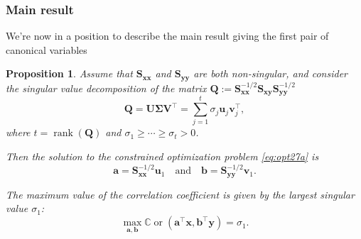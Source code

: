\documentclass[
]{book}
\newtheorem{proposition}{Proposition}[chapter]
\theoremstyle{definition}
\theoremstyle{definition}
\theoremstyle{definition}
\theoremstyle{definition}
\theoremstyle{remark}
\begin{document}
\hypertarget{main-result}{%
\subsubsection*{Main result}\label{main-result}}

We're now in a position to describe the main result giving the first pair of canonical variables

\begin{proposition}
\protect\hypertarget{prp:unnamed-chunk-2}{}\label{prp:unnamed-chunk-2}Assume that \(\mathbf S_{\mathbf x\mathbf x}\) and \(\mathbf S_{\mathbf y\mathbf y}\) are both non-singular, and consider the singular value decomposition of the matrix \(\mathbf Q:=\mathbf S_{\mathbf x\mathbf x}^{-1/2} \mathbf S_{\mathbf x\mathbf y}\mathbf S_{\mathbf y\mathbf y}^{-1/2}\)
\begin{equation}
\mathbf Q= {\mathbf U}{\pmb \Sigma} {\mathbf V}^\top = \sum_{j=1}^t \sigma_j {\mathbf u}_j {\mathbf v}_j^\top,
\label{eq:svdcca}
\end{equation}
where \(t=\operatorname{rank}(\mathbf Q)\) and \(\sigma_1 \geq \cdots \geq \sigma_t >0\).

Then the solution to the constrained optimization problem \eqref{eq:opt27a} is \[\mathbf a=\mathbf S_{\mathbf x\mathbf x}^{-1/2}{\mathbf u}_1\quad \mbox{and}\quad \mathbf b=\mathbf S_{\mathbf y\mathbf y}^{-1/2}{\mathbf v}_1.\]

The maximum value of the correlation coefficient is given by the largest singular value \(\sigma_1\):
\[\max_{\mathbf a, \mathbf b} {\mathbb{C}\operatorname{or}}(\mathbf a^\top\mathbf x, \mathbf b^\top\mathbf y)=\sigma_1.\]
\end{proposition}
\end{document}
